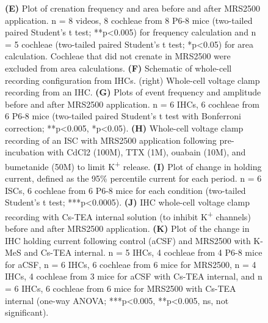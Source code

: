 \documentclass[9pt,lineno]{elife}
\begin{document}
\begin{figure} [t!]
\begin{fullwidth}
  \caption{\textbf{(E)} Plot of crenation frequency and area before and after MRS2500 application. n = 8 videos, 8 cochleae from 8 P6-8 mice (two-tailed paired Student's t test; **p<0.005) for frequency calculation and n = 5 cochleae (two-tailed paired Student's t test; *p<0.05) for area calculation. Cochleae that did not crenate in MRS2500 were excluded from area calculations.
\textbf{(F)} Schematic of whole-cell recording configuration from IHCs. (right) Whole-cell voltage clamp recording from an IHC.
\textbf{(G)} Plots of event frequency and amplitude before and after MRS2500 application. n = 6 IHCs, 6 cochleae from 6 P6-8 mice (two-tailed paired Student's t test with Bonferroni correction; **p<0.005, *p<0.05).
\textbf{(H)} Whole-cell voltage clamp recording of an ISC with MRS2500 application following pre-incubation with CdCl2 (100\textmu M), TTX (1\textmu M), ouabain (10\textmu M), and bumetanide (50\textmu M) to limit K\textsuperscript{+} release.
\textbf{(I)} Plot of change in holding current, defined as the 95\% percentile current for each period. n = 6 ISCs, 6 cochleae from 6 P6-8 mice for each condition (two-tailed Student’s t test; ***p<0.0005). 
\textbf{(J)} IHC whole-cell voltage clamp recording with Cs-TEA internal solution (to inhibit K\textsuperscript{+} channels) before and after MRS2500 application.
\textbf{(K)} Plot of the change in IHC holding current following control (aCSF) and MRS2500 with K-MeS and Cs-TEA internal. n = 5 IHCs, 4 cochleae from 4 P6-8 mice for aCSF, n = 6 IHCs, 6 cochleae from 6 mice for MRS2500, n = 4 IHCs, 4 cochleae from 3 mice for aCSF with Cs-TEA internal, and n = 6 IHCs, 6 cochleae from 6 mice for MRS2500 with Cs-TEA internal (one-way ANOVA; ***p<0.005, **p<0.005, ns, not significant).
}
\end{fullwidth}
\end{figure}
\end{document}
